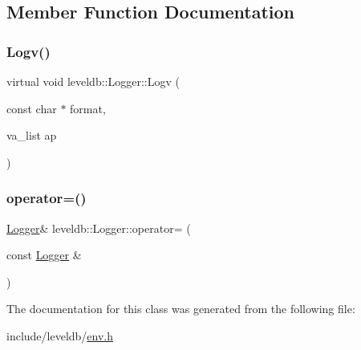 \subsection{Member Function Documentation}
\mbox{\label{classleveldb_1_1_logger_a408e238a0028a45e9cc7aec6ad2277c5}} 
\subsubsection{\texorpdfstring{Logv()}{Logv()}}
{\footnotesize\ttfamily virtual void leveldb\+::\+Logger\+::\+Logv (\begin{DoxyParamCaption}\item[{const char $\ast$}]{format,  }\item[{va\+\_\+list}]{ap }\end{DoxyParamCaption})\hspace{0.3cm}{\ttfamily [pure virtual]}}

\mbox{\label{classleveldb_1_1_logger_a0e59b980568313abcfc120a9d7022e7e}} 
\subsubsection{\texorpdfstring{operator=()}{operator=()}}
{\footnotesize\ttfamily \mbox{\hyperlink{classleveldb_1_1_logger}{Logger}}\& leveldb\+::\+Logger\+::operator= (\begin{DoxyParamCaption}\item[{const \mbox{\hyperlink{classleveldb_1_1_logger}{Logger}} \&}]{ }\end{DoxyParamCaption})\hspace{0.3cm}{\ttfamily [delete]}}



The documentation for this class was generated from the following file\+:\begin{DoxyCompactItemize}
\item 
include/leveldb/\mbox{\hyperlink{env_8h}{env.\+h}}\end{DoxyCompactItemize}
